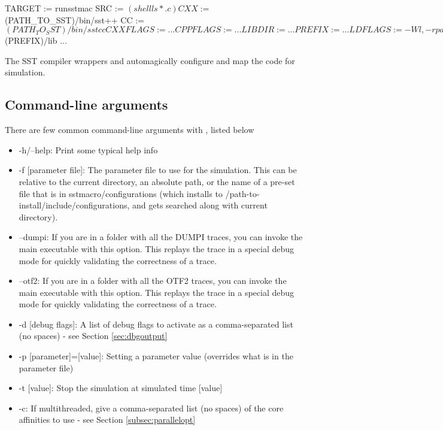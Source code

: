 \begin{ViFile}
TARGET := runsstmac
SRC := $(shell ls *.c) 

CXX :=      $(PATH_TO_SST)/bin/sst++
CC :=        $(PATH_TO_SST)/bin/sstcc
CXXFLAGS := ...
CPPFLAGS := ...
LIBDIR :=  ...
PREFIX :=   ...
LDFLAGS :=  -Wl,-rpath,$(PREFIX)/lib
...
\end{ViFile}
The SST compiler wrappers  and  automagically configure and map the code for simulation. 

\subsection{Command-line arguments}
\label{subsec:tutorial:cmdline}

There are few common command-line arguments with \sstmacro, listed below

\begin{itemize}
\item -h/--help: Print some typical help info
\item -f [parameter file]: The parameter file to use for the simulation.  
This can be relative to the current directory, an absolute path, or the name of a pre-set file that is in sstmacro/configurations 
(which installs to /path-to-install/include/configurations, and gets searched along with current directory). 
\item --dumpi: If you are in a folder with all the DUMPI traces, you can invoke the main  executable with this option.  This replays the trace in a special debug mode for quickly validating the correctness of a trace.
\item --otf2: If you are in a folder with all the OTF2 traces, you can invoke the main  executable with this option.  This replays the trace in a special debug mode for quickly validating the correctness of a trace.
\item -d [debug flags]: A list of debug flags to activate as a comma-separated list (no spaces) - see Section \ref{sec:dbgoutput}
\item -p [parameter]=[value]: Setting a parameter value (overrides what is in the parameter file)
\item -t [value]: Stop the simulation at simulated time [value]
\item -c: If multithreaded, give a comma-separated list (no spaces) of the core affinities to use - see Section \ref{subsec:parallelopt}
\end{itemize}

